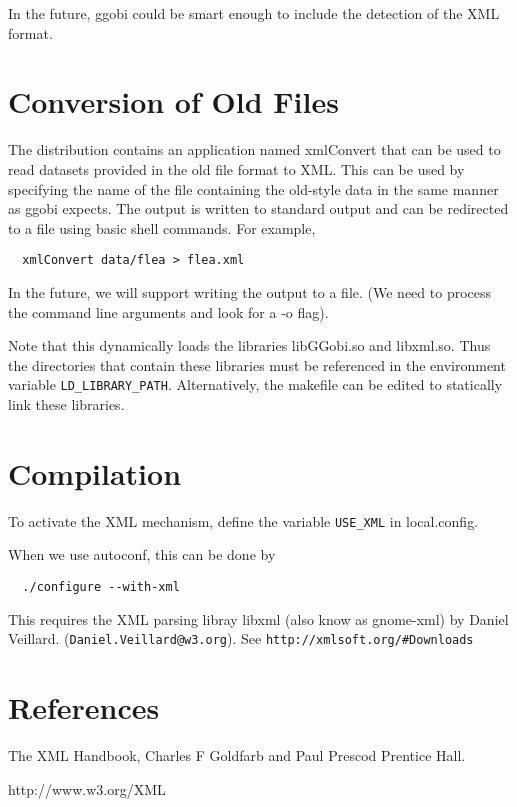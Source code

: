 \documentclass{article}
\begin{document}
In the future, ggobi could be smart enough to include the detection of
the XML format.



\section{Conversion of Old Files}
The distribution contains an application named xmlConvert that can be
used to read datasets provided in the old file format to XML.  This
can be used by specifying the name of the file containing the
old-style data in the same manner as ggobi expects.
The output is written to standard output
and can be redirected to a file using basic shell commands.
For example,
\begin{verbatim}
  xmlConvert data/flea > flea.xml
\end{verbatim}
In the future, we will support writing the output to a file. (We need
to process the command line arguments and look for a -o flag).


Note that this dynamically loads the libraries libGGobi.so and
libxml.so.  Thus the directories that contain these libraries must be
referenced in the environment variable 
\texttt{LD_LIBRARY_PATH}.
Alternatively, the makefile can be edited to statically link these
libraries.


\section{Compilation}
To activate the XML mechanism, define the variable
\texttt{USE_XML} in  local.config.

When we use autoconf, this can be done by
\begin{verbatim}
  ./configure --with-xml
\end{verbatim}

This requires the XML parsing libray libxml (also know as gnome-xml) by Daniel Veillard.
(\texttt{Daniel.Veillard@w3.org}).
See \texttt{http://xmlsoft.org/#Downloads}
\section{References}
The XML Handbook, Charles F Goldfarb and Paul Prescod
 Prentice Hall.

http://www.w3.org/XML
\end{document}
